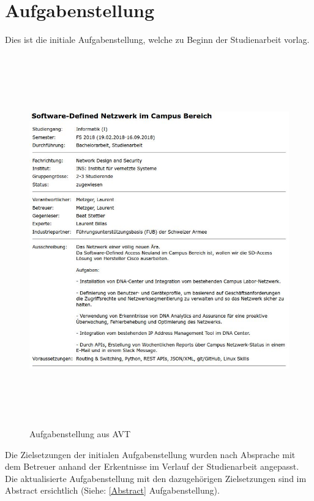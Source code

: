 \section{Aufgabenstellung}
Dies ist die initiale Aufgabenstellung, welche zu Beginn der Studienarbeit vorlag. 

\begin{figure}[H]
	\centering
	\includegraphics[height=16cm]{img/aufgabenstellung.jpg}
	\caption{Aufgabenstellung aus AVT \cite{avt-tool}}
	\label{fig:Aufgabenstellung}
\end{figure}

Die Zielsetzungen der initialen Aufgabenstellung wurden nach Absprache mit dem Betreuer anhand der Erkentnisse im Verlauf der Studienarbeit angepasst. Die aktualisierte Aufgabenstellung mit den dazugehörigen Zielsetzungen sind im Abstract ersichtlich (Siehe: \ref{Abstract} Aufgabenstellung).
